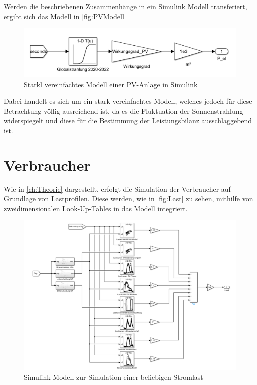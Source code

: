 Werden die beschriebenen Zusammenhänge in ein Simulink Modell transferiert, ergibt sich das Modell in \autoref{fig:PVModell}

\begin{figure}[H]
	\centering
	\includegraphics[width=0.9\linewidth]{Abbildungen/PVModell.png}
	\caption{Starkl vereinfachtes Modell einer PV-Anlage in Simulink}
	\label{fig:PVModell}
\end{figure}

Dabei handelt es sich um ein stark vereinfachtes Modell, welches jedoch für diese Betrachtung völlig ausreichend ist, da es die Fluktuation der Sonnenstrahlung widerspiegelt und diese für die Bestimmung der Leistungsbilanz ausschlaggebend ist.

\section{Verbraucher}

Wie in \autoref{ch:Theorie} dargestellt, erfolgt die Simulation der Verbraucher auf Grundlage von Lastprofilen. Diese werden, wie in \autoref{fig:Last} zu sehen, mithilfe von zweidimensionalen Look-Up-Tables in das Modell integriert. 

\begin{figure}[H]
	\centering
	\includegraphics[width=0.9\linewidth]{Abbildungen/LastBilanziell.png}
	\caption{Simulink Modell zur Simulation einer beliebigen Stromlast}
	\label{fig:Last}
\end{figure}

